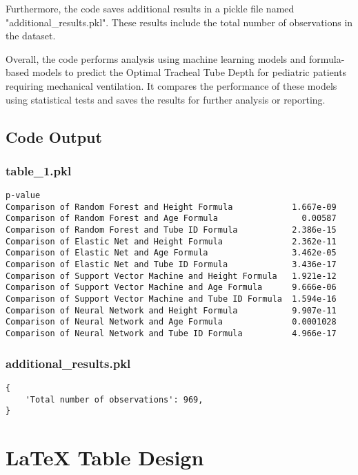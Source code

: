 \documentclass[11pt]{article}
\begin{document}
Furthermore, the code saves additional results in a pickle file named "additional\_results.pkl". These results include the total number of observations in the dataset.

Overall, the code performs analysis using machine learning models and formula-based models to predict the Optimal Tracheal Tube Depth for pediatric patients requiring mechanical ventilation. It compares the performance of these models using statistical tests and saves the results for further analysis or reporting.

\subsection{Code Output}

\subsubsection*{table\_1.pkl}

\begin{Verbatim}[tabsize=4]
                                                            p-value
Comparison of Random Forest and Height Formula            1.667e-09
Comparison of Random Forest and Age Formula                 0.00587
Comparison of Random Forest and Tube ID Formula           2.386e-15
Comparison of Elastic Net and Height Formula              2.362e-11
Comparison of Elastic Net and Age Formula                 3.462e-05
Comparison of Elastic Net and Tube ID Formula             3.436e-17
Comparison of Support Vector Machine and Height Formula   1.921e-12
Comparison of Support Vector Machine and Age Formula      9.666e-06
Comparison of Support Vector Machine and Tube ID Formula  1.594e-16
Comparison of Neural Network and Height Formula           9.907e-11
Comparison of Neural Network and Age Formula              0.0001028
Comparison of Neural Network and Tube ID Formula          4.966e-17
\end{Verbatim}

\subsubsection*{additional\_results.pkl}

\begin{Verbatim}[tabsize=4]
{
    'Total number of observations': 969,
}
\end{Verbatim}

\section{LaTeX Table Design}
\end{document}
